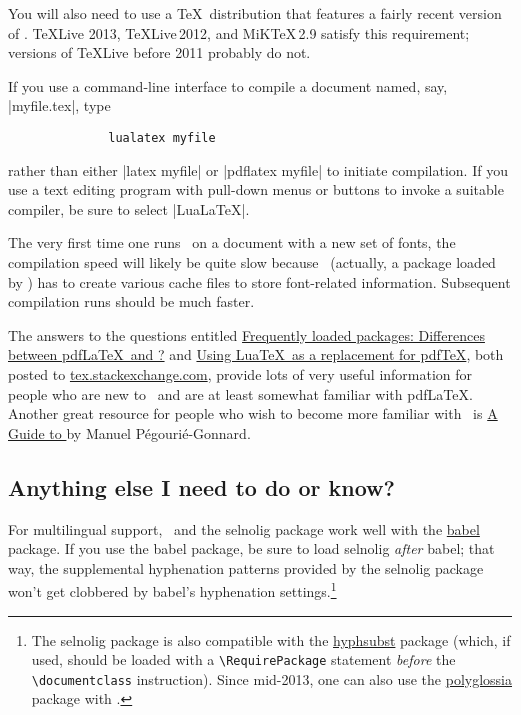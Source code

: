\documentclass[11pt]{article}
\newcommand{\pkg}[1]{\textsf{#1}}
\begin{document}
You will also need to use a \TeX\ distribution that features a fairly recent version of \LuaLaTeX. \TeX Live 2013, \TeX Live\,2012, and MiK\TeX\,2.9 satisfy this requirement; versions of \TeX Live before 2011 probably do not.

If you use a command-line interface to compile a document named, say, |myfile.tex|, type 
\begin{Verbatim}
              lualatex myfile
\end{Verbatim}
rather than either |latex myfile| or |pdflatex myfile| to initiate compilation. If you use a text editing program with pull-down menus or buttons to invoke a suitable compiler, be sure to select |LuaLaTeX|. 

The very first time one runs \LuaLaTeX\ on a document with a new set of fonts, the compilation speed will likely be quite slow because \LuaLaTeX\ (actually, a package loaded by \LuaLaTeX) has to create various cache files to store font-related information. Subsequent compilation runs should be much faster. 

The answers to the questions entitled \href{http://tex.stackexchange.com/q/28642/5001}{Frequently loaded packages: Differences between pdf\LaTeX\ and \LuaLaTeX?} and \href{http://tex.stackexchange.com/q/32295/5001}{Using Lua\TeX\ as a replacement for pdf\TeX}, both posted to \href{http://tex.stackexchange.com/}{tex.stackexchange.com}, provide lots of very useful information for people who are new to \LuaLaTeX\ and are at least somewhat familiar with pdf\LaTeX. Another great resource for people who wish to become more familiar with \LuaLaTeX\ is \href{http://mirror.ctan.org/info/luatex/lualatex-doc/lualatex-doc.pdf}{A Guide to \LuaLaTeX} by Manuel Pégourié-Gonnard.




\subsection{Anything else I need to do or know?} \label{sec:anythingelse}

For multilingual support, \LuaLaTeX\ and the \pkg{selnolig} package work well with the \href{http://www.ctan.org/pkg/babel}{\pkg{babel}} package. If you use the \pkg{babel} package, be sure to load \pkg{selnolig} \emph{after} \pkg{babel}; that way, the supplemental hyphenation patterns provided by the \pkg{selnolig} package won't get clobbered by \pkg{babel}'s hyphenation settings.\footnote{The \pkg{selnolig} package is also compatible with the \href{http://www.ctan.org/pkg/hyphsubst}{\pkg{hyphsubst}} package (which, if used, should be loaded with a \Verb+\RequirePackage+ statement \emph{before} the \Verb+\documentclass+ instruction). Since mid-2013, one can also use the \href{http://www.ctan.org/tex-archive/macros/latex/contrib/polyglossia}{\pkg{polyglossia}} package with \LuaLaTeX.}
\end{document}
